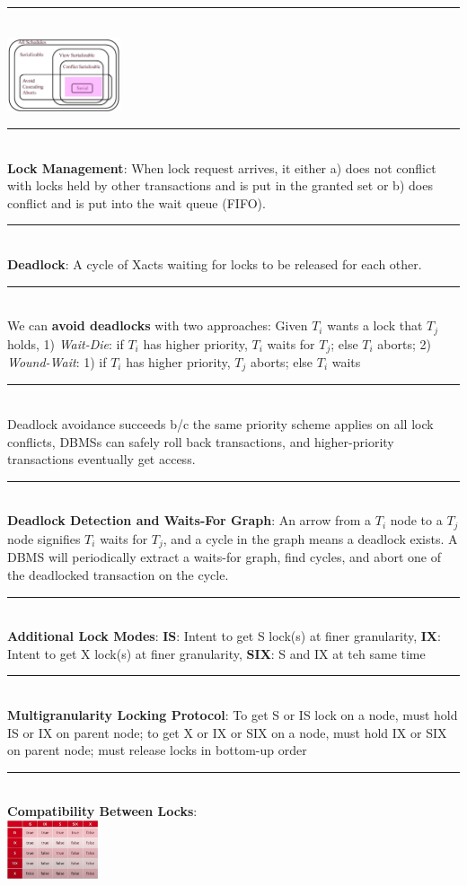 \documentclass[10pt,landscape]{article}
\newcommand{\ruler}{\\\rule{\columnwidth}{0.25pt}\\}
\begin{document}
\begin{multicols*}{3}
\ruler
\includegraphics[width=0.25\textwidth]{images/SerializabiltySchedulePIcture.png}
\ruler
\textbf{Lock Management}: When lock request arrives, it either a) does not conflict with locks held by other transactions and is put in the granted set or b) does conflict and is put into the wait queue (FIFO).
\ruler
\textbf{Deadlock}: A cycle of Xacts waiting for locks to be released for each other. 
\ruler
We can \textbf{avoid deadlocks} with two approaches: Given $T_i$ wants a lock that $T_j$ holds, 1) \textit{Wait-Die}: if $T_i$ has higher priority, $T_i$ waits for $T_j$; else $T_i$ aborts; 2) \textit{Wound-Wait}: 1) if $T_i$ has higher priority, $T_j$ aborts; else $T_i$ waits
\ruler
Deadlock avoidance succeeds b/c the same priority scheme applies on all lock conflicts, DBMSs can safely roll back transactions, and higher-priority transactions eventually get access.
\ruler
\textbf{Deadlock Detection and Waits-For Graph}: An arrow from a $T_i$ node to a $T_j$ node signifies $T_i$ waits for $T_j$, and a cycle in the graph means a deadlock exists. A DBMS will periodically extract a waits-for graph, find cycles, and abort one of the deadlocked transaction on the cycle.
\ruler
\textbf{Additional Lock Modes}: \textbf{IS}: Intent to get S lock(s) at finer granularity, \textbf{IX}: Intent to get X lock(s) at finer granularity, \textbf{SIX}: S and IX at teh same time
\ruler
\textbf{Multigranularity Locking Protocol}: To get S or IS lock on a node, must hold IS or IX on parent node; to get X or IX or SIX on a node, must hold IX or SIX on parent node; must release locks in bottom-up order
\ruler
\textbf{Compatibility Between Locks}:\\
\includegraphics[width=0.2\textwidth]{images/CompatibilityMatrix.png}

\end{multicols*}
\end{document}
